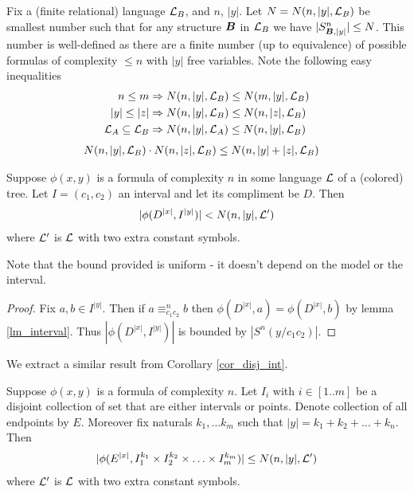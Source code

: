 \documentclass{amsart}
\DeclareMathOperator{\B}{\boldface B}
\begin{document}
\begin{Definition} \label{def_type_count}
	Fix a (finite relational) language $\mathcal L_B$, and $n$, $|y|$. Let $N = N(n, |y|, \mathcal L_B)$ be smallest number such that for any structure $\B$ in $\mathcal L_B$ we have $|S^n_{\B, |y|}| \leq N$. This number is well-defined as there are a finite number (up to equivalence) of possible formulas of complexity $\leq n$ with $|y|$ free variables. Note the following easy inequalities
	\begin{align*}
		n \leq m &\Rightarrow N(n, |y|, \mathcal L_B) \leq N(m, |y|, \mathcal L_B) \\
		|y| \leq |z| &\Rightarrow N(n, |y|, \mathcal L_B) \leq N(n, |z|, \mathcal L_B) \\
		\mathcal L_A \subseteq \mathcal L_B &\Rightarrow N(n, |y|, \mathcal L_A) \leq N(n, |y|, \mathcal L_B)
	\end{align*}
	\begin{align*}
		N(n, |y|, \mathcal L_B) \cdot N(n, |z|, \mathcal L_B) &\leq N(n, |y|+|z|, \mathcal L_B) 
	\end{align*}
\end{Definition}

\begin{Lemma} \label{lm_easy_bound}
	Suppose $\phi(x,y)$ is a formula of complexity $n$ in some language $\mathcal L$ of a (colored) tree. Let $I = (c_1, c_2)$ an interval and let its compliment be $D$. Then  
	\begin{align*}
		|\phi(D^{|x|}, I^{|y|})| < N(n, |y|, \mathcal L')
	\end{align*}
	where $\mathcal L'$ is $\mathcal L$ with two extra constant symbols.
\end{Lemma}

Note that the bound provided is uniform - it doesn't depend on the model or the interval.

\begin{proof}
	Fix $a, b \in I^{|y|}$. Then if $a \equiv^n_{c_1c_2} b$ then $\phi(D^{|x|}, a) = \phi(D^{|x|}, b)$ by lemma \ref{lm_interval}. Thus $|\phi(D^{|x|}, I^{|y|})|$ is bounded by $|S^n(y/c_1c_2)|$.
\end{proof}

We extract a similar result from Corollary \ref{cor_disj_int}.

\begin{Lemma} \label{lm_hard_bound}
	Suppose $\phi(x,y)$ is a formula of complexity $n$. Let $I_i$ with $i \in [1..m]$ be a disjoint collection of set that are either intervals or points. Denote collection of all endpoints by $E$. Moreover fix naturals $k_1, \ldots k_m$ such that $|y| = k_1 + k_2 + \ldots + k_n$. Then
	\begin{align*}
		|\phi(E^{|x|}, I_1^{k_1} \times I_2^{k_2} \times \ldots \times I_m^{k_m})| \leq N(n, |y|, \mathcal L')
	\end{align*}
	where $\mathcal L'$ is $\mathcal L$ with two extra constant symbols.
\end{Lemma}
\end{document}
